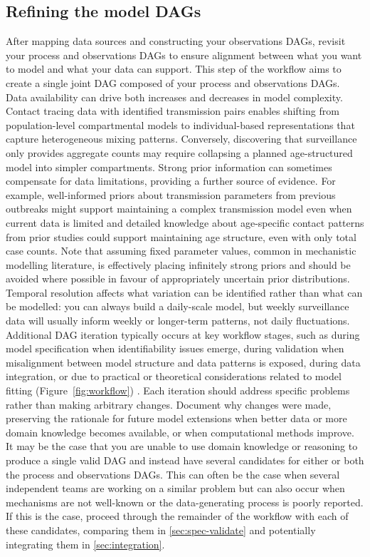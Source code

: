 \documentclass{article}
\begin{document}
\subsection{Refining the model DAGs} \label{sec:refine-dags}

After mapping data sources and constructing your observations DAGs, revisit your process and observations DAGs to ensure alignment between what you want to model and what your data can support.
This step of the workflow aims to create a single joint DAG composed of your process and observations DAGs.
Data availability can drive both increases and decreases in model complexity.
Contact tracing data with identified transmission pairs enables shifting from population-level compartmental models to individual-based representations that capture heterogeneous mixing patterns.
Conversely, discovering that surveillance only provides aggregate counts may require collapsing a planned age-structured model into simpler compartments.
Strong prior information can sometimes compensate for data limitations, providing a further source of evidence.
For example, well-informed priors about transmission parameters from previous outbreaks might support maintaining a complex transmission model even when current data is limited and detailed knowledge about age-specific contact patterns from prior studies could support maintaining age structure, even with only total case counts.
Note that assuming fixed parameter values, common in mechanistic modelling literature, is effectively placing infinitely strong priors and should be avoided where possible in favour of appropriately uncertain prior distributions.
Temporal resolution affects what variation can be identified rather than what can be modelled: you can always build a daily-scale model, but weekly surveillance data will usually inform weekly or longer-term patterns, not daily fluctuations.
Additional DAG iteration typically occurs at key workflow stages, such as during model specification when identifiability issues emerge, during validation when misalignment between model structure and data patterns is exposed, during data integration, or due to practical or theoretical considerations related to model fitting (Figure~\ref{fig:workflow}) \citep{corbella2022inferring}.
Each iteration should address specific problems rather than making arbitrary changes.
Document why changes were made, preserving the rationale for future model extensions when better data or more domain knowledge becomes available, or when computational methods improve.
It may be the case that you are unable to use domain knowledge or reasoning to produce a single valid DAG and instead have several candidates for either or both the process and observations DAGs. 
This can often be the case when several independent teams are working on a similar problem but can also occur when mechanisms are not well-known or the data-generating process is poorly reported.
If this is the case, proceed through the remainder of the workflow with each of these candidates, comparing them in \ref{sec:spec-validate} and potentially integrating them in \ref{sec:integration}.
\end{document}
